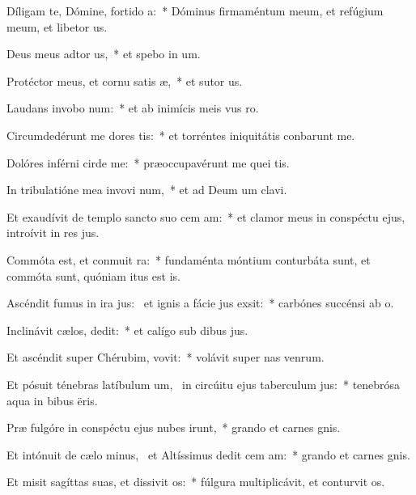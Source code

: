 \item Díligam te, Dómine, fortido a:~* Dóminus firmaméntum meum, et refúgium meum, et libetor us.
\item Deus meus adtor us,~* et spebo in um.
\item Protéctor meus, et cornu satis æ,~* et sutor us.
\item Laudans invobo num:~* et ab inimícis meis vus ro.
\item Circumdedérunt me dores tis:~* et torréntes iniquitátis conbarunt me.
\item Dolóres inférni cirde me:~* præoccupavérunt me quei tis.
\item In tribulatióne mea invovi num,~* et ad Deum um clavi.
\item Et exaudívit de templo sancto suo cem am:~* et clamor meus in conspéctu ejus, introívit in res jus.
\item Commóta est, et conmuit ra:~* fundaménta móntium conturbáta sunt, et commóta sunt, quóniam itus est is.
\item Ascéndit fumus in ira jus:~\pscross{} et ignis a fácie jus exsit:~* carbónes succénsi  ab o.
\item Inclinávit cælos,  dedit:~* et calígo sub dibus jus.
\item Et ascéndit super Chérubim,  vovit:~* volávit super nas venrum.
\item Et pósuit ténebras latíbulum um,~\pscross{} in circúitu ejus taberculum jus:~* tenebrósa aqua in bibus ëris.
\item Præ fulgóre in conspéctu ejus nubes irunt,~* grando et carnes gnis.
\item Et intónuit de cælo minus,~\pscross{} et Altíssimus dedit cem am:~* grando et carnes gnis.
\item Et misit sagíttas suas, et dissivit os:~* fúlgura multiplicávit, et conturvit os.
